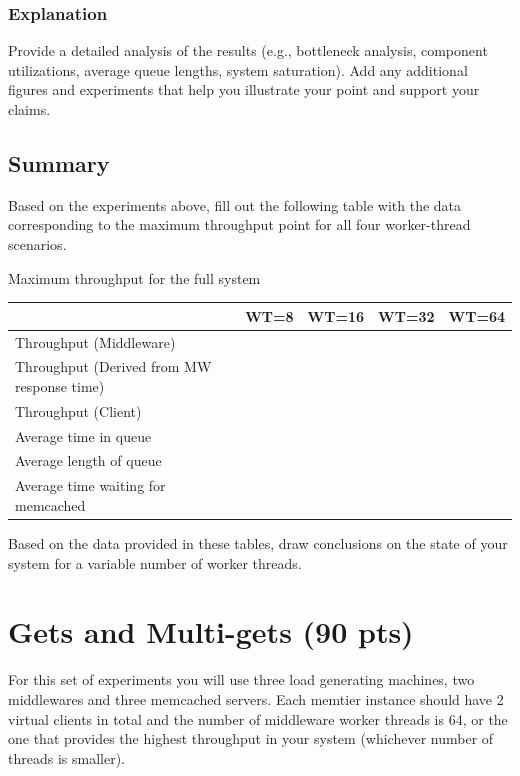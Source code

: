 \documentclass[11pt,a4paper]{article}
\begin{document}
\subsubsection{Explanation}

Provide a detailed analysis of the results (e.g., bottleneck analysis, component utilizations, average queue lengths, system saturation). Add any additional figures and experiments that help you illustrate your point and support your claims.

\subsection{Summary}

Based on the experiments above, fill out the following table with the data corresponding to the maximum throughput point for all four worker-thread scenarios.

\begin{center}
	{Maximum throughput for the full system}
	\begin{tabular}{|l|p{1.5cm}|p{1.5cm}|p{1.5cm}|p{1.5cm}|}
		\hline                                            & WT=8 & WT=16 & WT=32 & WT=64 \\ 
		\hline Throughput (Middleware)                    &      &       &       &       \\ 
		\hline Throughput (Derived from MW response time) &      &       &       &       \\ 
		\hline Throughput (Client)                        &      &       &       &       \\ 
		\hline Average time in queue                      &      &       &       &       \\ 
		\hline Average length of queue                    &      &       &       &       \\ 
		\hline Average time waiting for memcached         &      &       &       &       \\ 
		\hline 
	\end{tabular}
\end{center}

Based on the data provided in these tables, draw conclusions on the state of your system for a variable number of worker threads.

\section{Gets and Multi-gets (90 pts)}

For this set of experiments you will use three load generating machines, two middlewares and three memcached servers. Each memtier instance should have 2 virtual clients in total and the number of middleware worker threads is 64, or the one that provides the highest throughput in your system (whichever number of threads is smaller).
\end{document}
